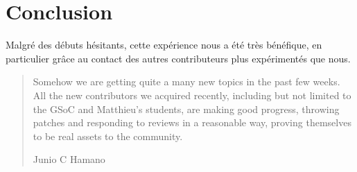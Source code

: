 \documentclass[a4paper, 12pt]{article}
\begin{document}
\section{Conclusion}

Malgré des débuts hésitants, cette expérience nous a été très bénéfique, en particulier grâce au contact des autres contributeurs plus expérimentés que nous.


\begin{quote} 
   Somehow we are getting quite a many new topics in the past few
weeks.  All the new contributors we acquired recently, including but not limited to the GSoC and Matthieu's students, are making good progress, throwing patches and responding to reviews in a reasonable way, proving themselves to be real assets to the community.
   \begin{flushright}
      Junio C Hamano
   \end{flushright}
\end{quote}
\end{document}
